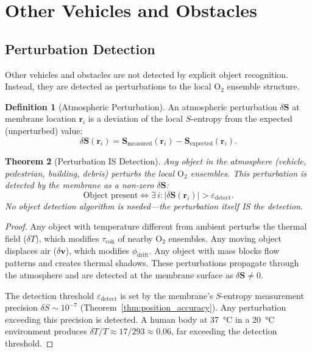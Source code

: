 \documentclass[twocolumn,10pt]{article}
\newtheorem{theorem}{Theorem}[section]
\theoremstyle{definition}
\newtheorem{definition}[theorem]{Definition}
\theoremstyle{remark}
\begin{document}
\section{Other Vehicles and Obstacles}
\label{sec:obstacles}

\subsection{Perturbation Detection}

Other vehicles and obstacles are not detected by explicit object recognition. Instead, they are detected as perturbations to the local $\mathrm{O}_2$ ensemble structure.

\begin{definition}[Atmospheric Perturbation]
\label{def:perturbation}
An atmospheric perturbation $\delta\mathbf{S}$ at membrane location $\mathbf{r}_i$ is a deviation of the local $S$-entropy from the expected (unperturbed) value:
\begin{equation}
  \delta\mathbf{S}(\mathbf{r}_i) = \mathbf{S}_{\mathrm{measured}}(\mathbf{r}_i) - \mathbf{S}_{\mathrm{expected}}(\mathbf{r}_i).
  \label{eq:perturbation}
\end{equation}
\end{definition}

\begin{theorem}[Perturbation IS Detection]
\label{thm:perturbation_detection}
Any object in the atmosphere (vehicle, pedestrian, building, debris) perturbs the local $\mathrm{O}_2$ ensembles. This perturbation is detected by the membrane as a non-zero $\delta\mathbf{S}$:
\begin{equation}
  \text{Object present} \iff \exists\, i : |\delta\mathbf{S}(\mathbf{r}_i)| > \varepsilon_{\mathrm{detect}}.
  \label{eq:detection}
\end{equation}
No object detection algorithm is needed---the perturbation itself IS the detection.
\end{theorem}

\begin{proof}
Any object with temperature different from ambient perturbs the thermal field ($\delta T$), which modifies $\tau_{\mathrm{coh}}$ of nearby $\mathrm{O}_2$ ensembles. Any moving object displaces air ($\delta \mathbf{v}$), which modifies $\phi_{\mathrm{drift}}$. Any object with mass blocks flow patterns and creates thermal shadows. These perturbations propagate through the atmosphere and are detected at the membrane surface as $\delta\mathbf{S} \neq 0$.

The detection threshold $\varepsilon_{\mathrm{detect}}$ is set by the membrane's $S$-entropy measurement precision $\delta S \sim 10^{-7}$ (Theorem~\ref{thm:position_accuracy}). Any perturbation exceeding this precision is detected. A human body at \SI{37}{\celsius} in a \SI{20}{\celsius} environment produces $\delta T / T \approx 17/293 \approx 0.06$, far exceeding the detection threshold.
\end{proof}
\end{document}
